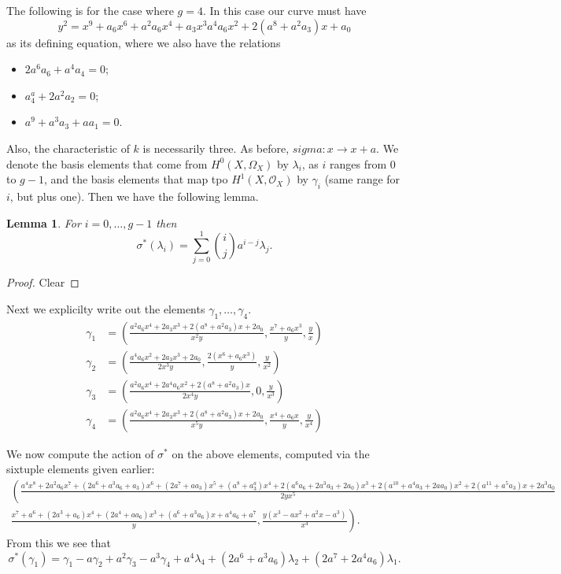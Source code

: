 \documentclass[draft, 11pt]{article} %
\theoremstyle{plain}
\newtheorem{lem}[defn]{Lemma}
\theoremstyle{remark}
\newcommand{\hzero}{{H^0(X,\Omega_X)}}
\newcommand{\hone}{H^1(X,\mathcal{O}_X)}
\begin{document}
The following is for the case where $g = 4$.
In this case our curve must have 
\[
y^2 = x^9 + a_6x^6+ a^2a_6x^4+a_3x^3a^4a_6x^2 +2(a^8 + a^2a_3)x +a_0
\]
as its defining equation, where we also have the relations
\begin{itemize}
\item $2a^6a_6 + a^4a_4 = 0$;
\item $a^a_4 + 2a^2a_2 = 0$;
\item $a^9 + a^3a_3 + aa_1 = 0$.
\end{itemize}
Also, the characteristic of $k$ is necessarily three.
As before, $sigma \colon x \to x+a$.
We denote the basis elements that come from $\hzero$ by $\lambda_i$, as $i$ ranges from $0$ to $g-1$, and the basis elements that map tpo $\hone$ by $\gamma_i$ (same range for $i$, but plus one).
Then we have the following lemma.
\begin{lem}
For $i = 0, \ldots , g-1$ then
\[
\sigma^*(\lambda_i) = \sum_{j=0}^1 \binom{i}{j} a^{i-j} \lambda_j.
\]
\end{lem}
\begin{proof}
Clear
\end{proof}

Next we explicilty write out the elements $\gamma_1, \ldots, \gamma_4$.
\begin{align*}
\gamma_1 & = \left( \frac{a^2a_6x^4 + 2a_3x^3 + 2(a^8 + a^2a_3)x + 2a_0}{x^2y}, \frac{x^7 +a_6x^3}{y}, \frac{y}{x} \right)\\
\gamma_2 & = \left(\frac{a^4a_6x^2 +2a_3x^3 +2a_0}{2x^3y} , \frac{2(x^6 +a_6x^3)}{y}, \frac{y}{ x^2 }\right)\\
\gamma_3 & = \left(\frac{a^2a_6x^4 + 2a^4a_6x^2 + 2(a^8 + a^2a_3)x }{2x^4y } , 0, \frac{y }{x^3 } \right)\\
\gamma_4 & = \left(\frac{a^2a_6x^4 +2a_3x^3 + 2(a^8 +a^2a_3)x + 2a_0 }{x^5y } , \frac{x^4+a_6x }{ y}, \frac{y }{ x^4} \right)
\end{align*}



We now compute the action of $\sigma^*$ on the above elements, computed via the sixtuple elements given earlier:
\begin{multline}
\left( \frac{a^4x^8 + 2a^2a_6x^7 + (2a^6 + a^3a_6 + a_3)x^6 + (2a^7 + aa_3)x^5 + (a^8  + a^a_3)x^4 + 2(a^6a_6+2a^3a_3+2a_0)x^3 + 2(a^{10}+a^4a_3+2aa_0)x^2 + 2(a^{11}+a^5a_3)x + 2a^3a_0}{2yx^5} \right. \\ \left. \frac{x^7 + a^6 + (2a^3+a_6)x^4 + (2a^4+aa_6)x^3 + (a^6 + a^3a_6)x + a^4a_6 + a^7}{y}, \frac{y(x^3-ax^2+a^2x-a^3)}{x^4} \right).
\end{multline}
From this we see that
\[
\sigma^*(\gamma_1) = \gamma_1 - a\gamma_2 + a^2\gamma_3 - a^3\gamma_4 + a^4\lambda_4 + (2a^6 + a^3a_6)\lambda_2 + (2a^7 + 2a^4a_6)\lambda_1.
\]
\end{document}
